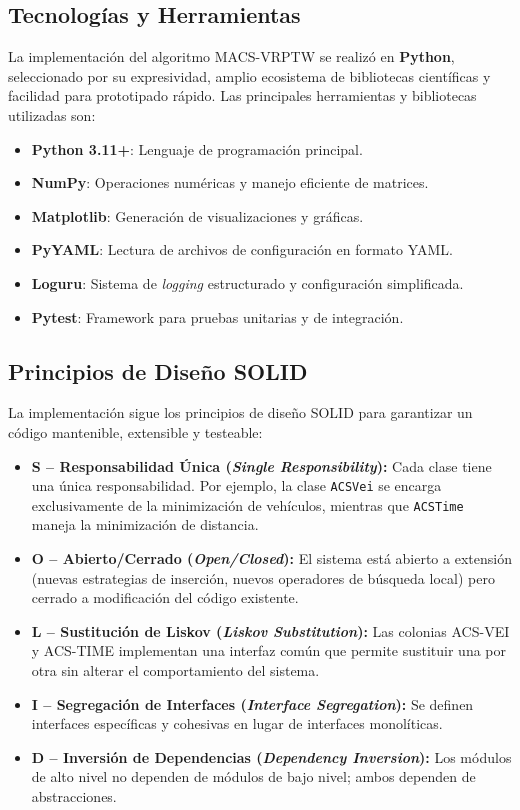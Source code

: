 \documentclass[12pt, letterpaper]{article}
\begin{document}
\subsection{Tecnologías y Herramientas}
\label{subsec:tecnologias}

La implementación del algoritmo MACS-VRPTW se realizó en \textbf{Python}, seleccionado por su expresividad, amplio ecosistema de bibliotecas científicas y facilidad para prototipado rápido. Las principales herramientas y bibliotecas utilizadas son:

\begin{itemize}[leftmargin=2cm]
  \item \textbf{Python 3.11+}: Lenguaje de programación principal.
  \item \textbf{NumPy}: Operaciones numéricas y manejo eficiente de matrices.
  \item \textbf{Matplotlib}: Generación de visualizaciones y gráficas.
  \item \textbf{PyYAML}: Lectura de archivos de configuración en formato YAML.
  \item \textbf{Loguru}: Sistema de \textit{logging} estructurado y configuración simplificada.
  \item \textbf{Pytest}: Framework para pruebas unitarias y de integración.
\end{itemize}

\subsection{Principios de Diseño SOLID}
\label{subsec:solid}

La implementación sigue los principios de diseño SOLID para garantizar un código mantenible, extensible y testeable:

\begin{itemize}[leftmargin=2cm]
  \item \textbf{S -- Responsabilidad Única (\textit{Single Responsibility}):} Cada clase tiene una única responsabilidad. Por ejemplo, la clase \texttt{ACSVei} se encarga exclusivamente de la minimización de vehículos, mientras que \texttt{ACSTime} maneja la minimización de distancia.
  \item \textbf{O -- Abierto/Cerrado (\textit{Open/Closed}):} El sistema está abierto a extensión (nuevas estrategias de inserción, nuevos operadores de búsqueda local) pero cerrado a modificación del código existente.
  \item \textbf{L -- Sustitución de Liskov (\textit{Liskov Substitution}):} Las colonias ACS-VEI y ACS-TIME implementan una interfaz común que permite sustituir una por otra sin alterar el comportamiento del sistema.
  \item \textbf{I -- Segregación de Interfaces (\textit{Interface Segregation}):} Se definen interfaces específicas y cohesivas en lugar de interfaces monolíticas.
  \item \textbf{D -- Inversión de Dependencias (\textit{Dependency Inversion}):} Los módulos de alto nivel no dependen de módulos de bajo nivel; ambos dependen de abstracciones.
\end{itemize}
\end{document}
